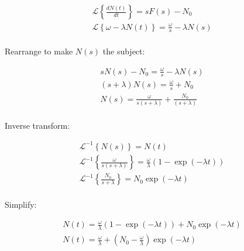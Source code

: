 \begin{equation}
\begin{split}
\mathcal{L}\left\{  \frac{dN(t)}{dt}       \right\} = sF(s) - N_{0} \\
\mathcal{L}\left\{  \omega - \lambda N(t)  \right\} = \frac{\omega}{s} - \lambda N(s) \\
\end{split}
\label{eq:decaysourceterm2}
\end{equation}
 
Rearrange to make $N(s)$ the subject:

\begin{equation}
\begin{split}
sN(s) - N_{0} = \frac{\omega}{s} - \lambda N(s) \\
(s + \lambda) N(s) = \frac{\omega}{s} + N_{0} \\
N(s) = \frac{\omega}{s(s + \lambda)} + \frac{N_{0}}{(s + \lambda)} \\
\end{split}
\label{eq:decaysourceterm3}
\end{equation}

Inverse transform:

\begin{equation}
\begin{split}
\mathcal{L}^{-1}\left\{  N(s)    \right\} = N(t) \\
\mathcal{L}^{-1}\left\{  \frac{\omega}{s(s + \lambda)}   \right\} = \frac{\omega}{\lambda} \left(1 - \exp(-\lambda t)\right) \\
\mathcal{L}^{-1}\left\{  \frac{N_{0}}{s + \lambda}   \right\} = N_{0} \exp(-\lambda t) \\
\end{split}
\label{eq:decaysourceterm3}
\end{equation}

Simplify:

\begin{equation}
\begin{split}
N(t) = \frac{\omega}{\lambda} \left(1 - \exp(-\lambda t)\right) + N_{0} \exp(-\lambda t)\\
N(t) = \frac{\omega}{\lambda} + \left(N_{0} - \frac{\omega}{\lambda} \right) \exp(-\lambda t) \\
\end{split}
\label{eq:decaysourceterm3}
\end{equation}










